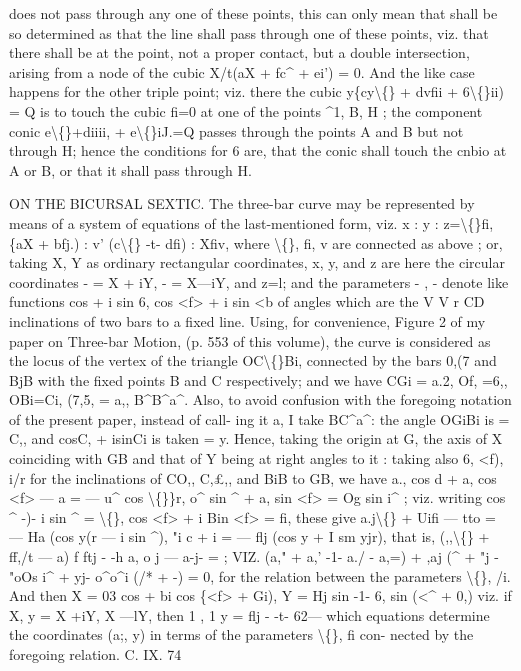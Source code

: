 \documentclass[11pt,a4paper]{book}
\begin{document}
does
not
pass
through
any
one
of
these
points,
this
can
only mean
that
shall
be
so
determined
as
that
the
line
shall
pass
through
one
of
these
points,
viz.
that
there
shall
be
at
the
point, not
a
proper
contact,
but
a
double
intersection,
arising
from
a
node
of
the
cubic
X/t(aX + fc\textasciicircum{} + ei') = 0.
And
the
like
case
happens
for
the
other
triple
point;
viz.
there the cubic
y\{cy\textbackslash\{\} + dvfii + 6\textbackslash\{\}ii) = Q
is
to
touch
the
cubic
fi=0
at
one
of
the
points
\textasciicircum{}1,
B, H
;
the
component
conic
e\guillemotright{}\textbackslash\{\}+diiii, + e\textbackslash\{\}iJ.=Q
passes
through
the
points A
and B
but
not
through H;
hence
the
conditions
for
6
are,
that the conic
shall touch the cnbio at A
or B,
or that
it shall pass through H.

ON THE BICURSAL SEXTIC.
The
three-bar
curve may
be
represented
by
means
of
a
system
of
equations
of
the
last-mentioned
form,
viz. x
: y
: z=\textbackslash\{\}fi, \{aX + bfj.)
:
v' (c\textbackslash\{\} -t- dfi)
: Xfiv, where \textbackslash\{\},
fi,
v
are
connected
as
above
;
or,
taking
X, Y
as
ordinary
rectangular
coordinates,
x,
y, and
z
are
here
the
circular
coordinates - = X + iY, - = X---iY, and z=l;
and
the parameters
-
,
-
denote
like
functions
cos
+ i sin 6,
cos
<f> + i sin
<b
of
angles
which
are
the
V
V
r
CD
inclinations
of two bars
to
a
fixed
line.
Using,
for
convenience,
Figure
2
of my paper
on
Three-bar
Motion,
(p.
553
of
this
volume),
the curve
is
considered
as
the
locus
of
the vertex
of the triangle
OC\textbackslash\{\}Bi, connected by the
bars
0,(7 and BjB with the
fixed
points B and C respectively; and we have CGi = a.2, Of, =6,, OBi=Ci,
(7,5, = a,, B\textasciicircum{}B\textasciicircum{}a\textasciicircum{}.
Also,
to avoid
confusion with
the foregoing notation
of the present paper,
instead of call-
ing
it
a,
I
take BC\textasciicircum{}a\textasciicircum{}:
the angle OGiBi
is = C,, and cosC, + isinCi
is taken = y.
Hence,
taking the
origin
at
G,
the
axis
of X coinciding with GB
and
that
of Y
being
at
right
angles
to
it
:
taking
also
6,
<f),
i/r
for the
inclinations
of CO,,
C,\pounds{},, and
BiB
to GB, we have
a., cos d + a, cos
<f> --- a = --- u\textasciicircum{} cos \textbackslash\{\}\}r,
o\textasciicircum{} sin \textasciicircum{} + a, sin
<f>
=
Og sin i\textasciicircum{}
;
viz.
writing cos \textasciicircum{} -)- i sin \textasciicircum{} = \textbackslash\{\}, cos <f> + i Bin
<f> = fi, these give
a.j\textbackslash\{\} + Uifi --- tto = --- Ha (cos y(r --- i sin \textbullet{}\textasciicircum{}),
"i c + \guillemotleft{}i
\guillemotleft{}\guillemotright{} = --- flj (cos y + I sm yjr),
that
is,
(\guillemotleft{},,\textbackslash\{\} + ff,/t --- a)
f ftj -
-h a,
\guillemotleft{}o j --- a-j- =
;
VIZ.
(a," + a,' -1- a./ - a,=) + \guillemotleft{},aj (\textasciicircum{} + "j - "oOs i\textasciicircum{} + yj- o\textasciicircum{}o\textasciicircum{}i (/* + -) = 0,
for the
relation between the parameters
\textbackslash\{\},
/i.
And then
X = 03 cos
+ bi cos \{<f> + Gi),
Y = Hj sin
-1- 6, sin (<\textasciicircum{} + 0,)
viz.
if X, y = X +iY, X ---lY, then
1
,
1
y = flj -
-t- 62---
which equations determine
the
coordinates
(a;, y)
in
terms
of
the
parameters
\textbackslash\{\},
fi
con-
nected by the foregoing relation.
C.
IX.
74
\end{document}
